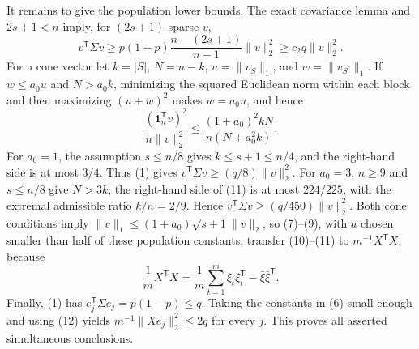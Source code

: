 It remains to give the population lower bounds.  The exact covariance lemma and \(2s+1<n\) imply, for \((2s+1)\)-sparse \(v\),
\[
 v^{\mathsf T}\Sigma v
 \ge p(1-p)\frac{n-(2s+1)}{n-1}\lVert v\rVert_2^2
 \ge c_2q\lVert v\rVert_2^2.                                        \tag{10}
\]
For a cone vector let \(k=|S|\), \(N=n-k\), \(u=\lVert v_S\rVert_1\), and \(w=\lVert v_{S^c}\rVert_1\).  If \(w\le a_0u\) and \(N>a_0k\), minimizing the squared Euclidean norm within each block and then maximizing \((u+w)^2\) makes \(w=a_0u\), and hence
\[
 \frac{(\mathbf 1_n^{\mathsf T}v)^2}{n\lVert v\rVert_2^2}
 \le \frac{(1+a_0)^2kN}{n(N+a_0^2k)}.                                \tag{11}
\]
For \(a_0=1\), the assumption \(s\le n/8\) gives \(k\le s+1\le n/4\), and the right-hand side is at most \(3/4\).  Thus (1) gives \(v^{\mathsf T}\Sigma v\ge(q/8)\lVert v\rVert_2^2\).  For \(a_0=3\), \(n\ge9\) and \(s\le n/8\) give \(N>3k\); the right-hand side of (11) is at most \(224/225\), with the extremal admissible ratio \(k/n=2/9\).  Hence \(v^{\mathsf T}\Sigma v\ge(q/450)\lVert v\rVert_2^2\).  Both cone conditions imply \(\lVert v\rVert_1\le(1+a_0)\sqrt{s+1}\lVert v\rVert_2\), so (7)--(9), with \(a\) chosen smaller than half of these population constants, transfer (10)--(11) to \(m^{-1}X^{\mathsf T}X\), because
\[
 \frac1mX^{\mathsf T}X
 =\frac1m\sum_{t=1}^m\xi_t\xi_t^{\mathsf T}-\bar\xi\bar\xi^{\mathsf T}.                     \tag{12}
\]
Finally, (1) has \(e_j^{\mathsf T}\Sigma e_j=p(1-p)\le q\).  Taking the constants in (6) small enough and using (12) yields \(m^{-1}\lVert Xe_j\rVert_2^2\le2q\) for every \(j\).  This proves all asserted simultaneous conclusions.
